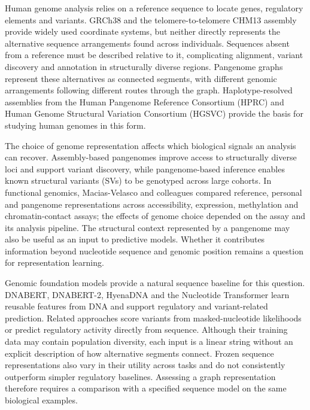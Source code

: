 \documentclass[11pt]{article}
\begin{document}
\begin{bibunit}[unsrtnat]
Human genome analysis relies on a reference sequence to locate genes, regulatory elements and variants. GRCh38 and the telomere-to-telomere CHM13 assembly provide widely used coordinate systems\cite{schneider2017grch38,nurk2022complete}, but neither directly represents the alternative sequence arrangements found across individuals. Sequences absent from a reference must be described relative to it, complicating alignment, variant discovery and annotation in structurally diverse regions\cite{paten2017genome,eizenga2020pangenome}. Pangenome graphs represent these alternatives as connected segments, with different genomic arrangements following different routes through the graph\cite{garrison2018variation,li2020minigraph,hickey2024pangenome}. Haplotype-resolved assemblies from the Human Pangenome Reference Consortium (HPRC) and Human Genome Structural Variation Consortium (HGSVC) provide the basis for studying human genomes in this form\cite{hprc2023draft,hgsvc2021,hgsvc32025}.

The choice of genome representation affects which biological signals an analysis can recover. Assembly-based pangenomes improve access to structurally diverse loci and support variant discovery\cite{hprc2023draft,hgsvc32025}, while pangenome-based inference enables known structural variants (SVs) to be genotyped across large cohorts\cite{siren2021giraffe,ebler2022pangenie}. In functional genomics, Macias-Velasco and colleagues compared reference, personal and pangenome representations across accessibility, expression, methylation and chromatin-contact assays; the effects of genome choice depended on the assay and its analysis pipeline\cite{macias2026benchmarking}. The structural context represented by a pangenome may also be useful as an input to predictive models. Whether it contributes information beyond nucleotide sequence and genomic position remains a question for representation learning.

Genomic foundation models provide a natural sequence baseline for this question. DNABERT, DNABERT-2, HyenaDNA and the Nucleotide Transformer learn reusable features from DNA and support regulatory and variant-related prediction\cite{ji2021dnabert,zhou2024dnabert2,nguyen2023hyenadna,dalla2025nucleotide}. Related approaches score variants from masked-nucleotide likelihoods\cite{benegas2023gpn} or predict regulatory activity directly from sequence\cite{avsec2021enformer}. Although their training data may contain population diversity, each input is a linear string without an explicit description of how alternative segments connect. Frozen sequence representations also vary in their utility across tasks and do not consistently outperform simpler regulatory baselines\cite{tang2025evaluating}. Assessing a graph representation therefore requires a comparison with a specified sequence model on the same biological examples.


\end{bibunit}
\end{document}
